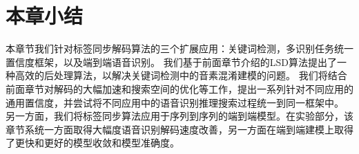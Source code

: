     
\section{本章小结}
\label{chap:unify-sum}



本章节我们针对标签同步解码算法的三个扩展应用：关键词检测，多识别任务统一置信度框架，以及端到端语音识别。
%
我们基于前面章节介绍的LSD算法提出了一种高效的后处理算法，以解决关键词检测中的音素混淆建模的问题。
%
我们将结合前面章节对解码的大幅加速和搜索空间的优化等工作，提出一系列针对不同应用的通用置信度，并尝试将不同应用中的语音识别推理搜索过程统一到同一框架中。
%
另一方面，我们将标签同步算法应用于序列到序列的端到端模型。在实验部分，该章节系统一方面取得大幅度语音识别解码速度改善，另一方面在端到端建模上取得了更快和更好的模型收敛和模型准确度。
